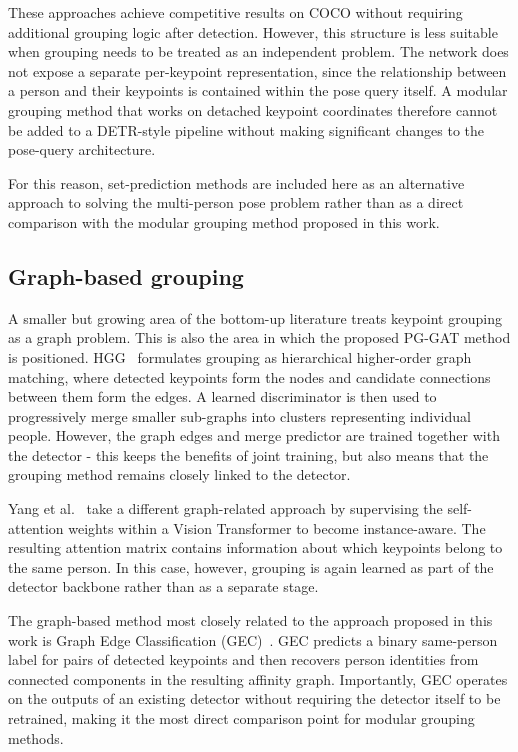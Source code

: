 These approaches achieve competitive results on COCO without requiring additional grouping logic after detection.
However, this structure is less suitable when grouping needs to be treated as an independent problem.
The network does not expose a separate per-keypoint representation,
since the relationship between a person and their keypoints is contained within the pose query itself.
A modular grouping method that works on detached keypoint coordinates
therefore cannot be added to a DETR-style pipeline without making significant changes to the pose-query architecture.

For this reason,
set-prediction methods are included here as an alternative approach to solving the multi-person pose problem
rather than as a direct comparison with the modular grouping method proposed in this work.

\subsection{Graph-based grouping}
\label{sec_lit_grouping_graph}

A smaller but growing area of the bottom-up literature treats keypoint grouping as a graph problem.
This is also the area in which the proposed PG-GAT method is positioned.
HGG~\cite{jin2020hgg} formulates grouping as hierarchical higher-order graph matching,
where detected keypoints form the nodes and candidate connections between them form the edges.
A learned discriminator is then used
to progressively merge smaller sub-graphs into clusters representing individual people.
However, the graph edges and merge predictor are trained together with the detector -
this keeps the benefits of joint training,
but also means that the grouping method remains closely linked to the detector.

Yang et al.~\cite{yang2023instanceaware} take a different graph-related approach
by supervising the self-attention weights within a Vision Transformer to become instance-aware.
The resulting attention matrix contains information about which keypoints belong to the same person.
In this case, however, grouping is again learned as part of the detector backbone rather than as a separate stage.

The graph-based method most closely related to the approach proposed in this work
is Graph Edge Classification (GEC)~\cite{maher2025gec}.
GEC predicts a binary same-person label for pairs of detected keypoints
and then recovers person identities from connected components in the resulting affinity graph.
Importantly, GEC operates on the outputs of an existing detector without requiring the detector itself to be retrained,
making it the most direct comparison point for modular grouping methods.

